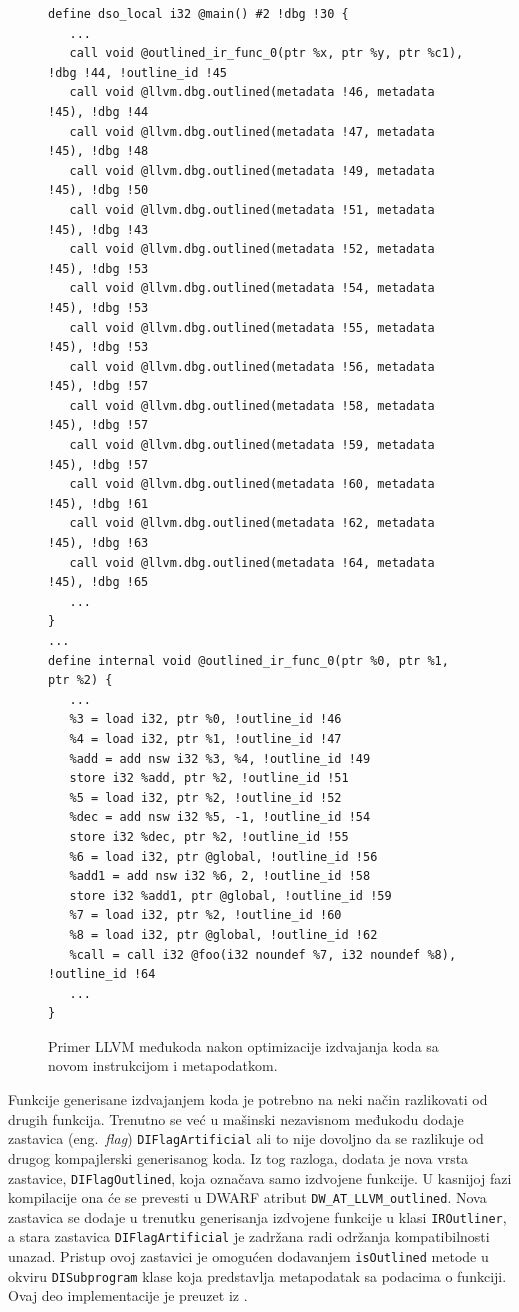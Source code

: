 \documentclass[12pt,oneside]{memoir}
\begin{document}
\begin{figure}
\begin{verbatim}
define dso_local i32 @main() #2 !dbg !30 {
   ...
   call void @outlined_ir_func_0(ptr %x, ptr %y, ptr %c1), !dbg !44, !outline_id !45
   call void @llvm.dbg.outlined(metadata !46, metadata !45), !dbg !44
   call void @llvm.dbg.outlined(metadata !47, metadata !45), !dbg !48
   call void @llvm.dbg.outlined(metadata !49, metadata !45), !dbg !50
   call void @llvm.dbg.outlined(metadata !51, metadata !45), !dbg !43
   call void @llvm.dbg.outlined(metadata !52, metadata !45), !dbg !53
   call void @llvm.dbg.outlined(metadata !54, metadata !45), !dbg !53
   call void @llvm.dbg.outlined(metadata !55, metadata !45), !dbg !53
   call void @llvm.dbg.outlined(metadata !56, metadata !45), !dbg !57
   call void @llvm.dbg.outlined(metadata !58, metadata !45), !dbg !57
   call void @llvm.dbg.outlined(metadata !59, metadata !45), !dbg !57
   call void @llvm.dbg.outlined(metadata !60, metadata !45), !dbg !61
   call void @llvm.dbg.outlined(metadata !62, metadata !45), !dbg !63
   call void @llvm.dbg.outlined(metadata !64, metadata !45), !dbg !65
   ...
}
...
define internal void @outlined_ir_func_0(ptr %0, ptr %1, ptr %2) {
   ...
   %3 = load i32, ptr %0, !outline_id !46
   %4 = load i32, ptr %1, !outline_id !47
   %add = add nsw i32 %3, %4, !outline_id !49
   store i32 %add, ptr %2, !outline_id !51
   %5 = load i32, ptr %2, !outline_id !52
   %dec = add nsw i32 %5, -1, !outline_id !54
   store i32 %dec, ptr %2, !outline_id !55
   %6 = load i32, ptr @global, !outline_id !56
   %add1 = add nsw i32 %6, 2, !outline_id !58
   store i32 %add1, ptr @global, !outline_id !59
   %7 = load i32, ptr %2, !outline_id !60
   %8 = load i32, ptr @global, !outline_id !62
   %call = call i32 @foo(i32 noundef %7, i32 noundef %8), !outline_id !64
   ...
}
\end{verbatim}
\caption{Primer LLVM međukoda nakon optimizacije izdvajanja koda sa novom instrukcijom i metapodatkom.}
\label{lst:outlining_ir_example}
\end{figure}

Funkcije generisane izdvajanjem koda je potrebno na neki način razlikovati od drugih funkcija.
Trenutno se već u mašinski nezavisnom međukodu dodaje zastavica (eng.~{\em flag}) \verb|DIFlagArtificial| ali to nije dovoljno da se razlikuje od drugog kompajlerski generisanog koda.
Iz tog razloga, dodata je nova vrsta zastavice, \verb|DIFlagOutlined|, koja označava samo izdvojene funkcije.
U kasnijoj fazi kompilacije ona će se prevesti u DWARF atribut \verb|DW_AT_LLVM_outlined|.
Nova zastavica se dodaje u trenutku generisanja izdvojene funkcije u klasi \verb|IROutliner|, a stara zastavica \verb|DIFlagArtificial| je zadržana radi održanja kompatibilnosti unazad.
Pristup ovoj zastavici je omogućen dodavanjem \verb|isOutlined| metode u okviru \verb|DISubprogram| klase koja predstavlja metapodatak sa podacima o funkciji.
Ovaj deo implementacije je preuzet iz \cite{tomasevic2022autlajning}.
\end{document}
